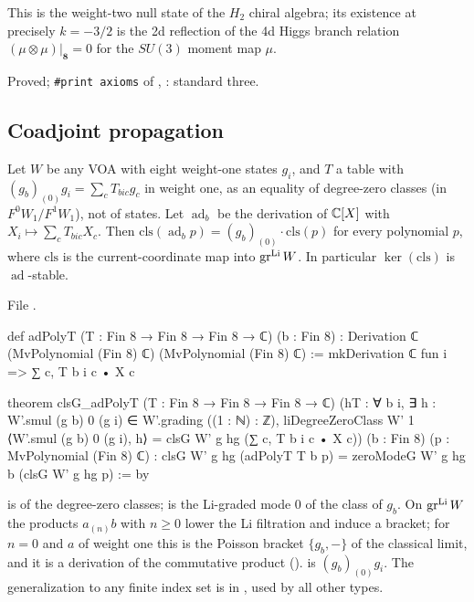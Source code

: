 \begin{physics}
This is the weight-two null state of the $H_2$ chiral algebra; its existence at precisely $k=-3/2$ is the
2d reflection of the 4d Higgs branch relation $(\mu\otimes\mu)|_{\mathbf 8}=0$ for the $SU(3)$ moment map $\mu$.
\end{physics}

\begin{status}
Proved; \texttt{\#print axioms} of , : standard three.
\end{status}

\subsection{Coadjoint propagation}

\begin{theorem}\label{l24:thm:adprop}
Let $W$ be any VOA with eight weight-one states $g_i$, and $T$ a table with $(g_b)_{(0)}g_i=\sum_cT_{bic}g_c$ in
weight one, as an equality of degree-zero classes (in $F^0W_1/F^1W_1$), not of states. Let $\operatorname{ad}_b$ be the derivation of ${\mathbb{C}}[X]$ with
$X_i\mapsto\sum_cT_{bic}X_c$. Then $\mathrm{cls}(\operatorname{ad}_bp)=(g_b)_{(0)}\cdot\mathrm{cls}(p)$ for every
polynomial $p$, where $\mathrm{cls}$ is the current-coordinate map into $\operatorname{gr}^{\mathrm{Li}} W$. In particular
$\ker(\mathrm{cls})$ is $\operatorname{ad}$-stable.
\end{theorem}
\noindent File .
\begin{leancode}
def adPolyT (T : Fin 8 → Fin 8 → Fin 8 → ℂ) (b : Fin 8) :
    Derivation ℂ (MvPolynomial (Fin 8) ℂ) (MvPolynomial (Fin 8) ℂ) :=
  mkDerivation ℂ fun i => ∑ c, T b i c • X c

theorem clsG_adPolyT (T : Fin 8 → Fin 8 → Fin 8 → ℂ)
    (hT : ∀ b i, ∃ h : W'.smul (g b) 0 (g i) ∈ W'.grading ((1 : ℕ) : ℤ),
      liDegreeZeroClass W' 1 ⟨W'.smul (g b) 0 (g i), h⟩ = clsG W' g hg (∑ c, T b i c • X c))
    (b : Fin 8) (p : MvPolynomial (Fin 8) ℂ) :
    clsG W' g hg (adPolyT T b p) = zeroModeG W' g hg b (clsG W' g hg p) := by
\end{leancode}

\begin{dictionary}
 is  of the degree-zero classes;  is the Li-graded mode
$0$ of the class of $g_b$. On $\operatorname{gr}^{\mathrm{Li}} W$ the products $a_{(n)}b$ with $n\ge0$ lower the Li filtration and induce a
bracket; for $n=0$ and $a$ of weight one this is the Poisson bracket $\{g_b,-\}$ of the classical limit, and it is a
derivation of the commutative product ().  is $(g_b)_{(0)}g_i$. The
generalization to any finite index set is  in
, used by all other types.
\end{dictionary}

